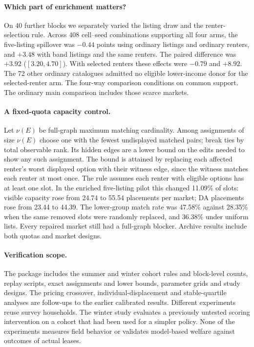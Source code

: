 \paragraph{Which part of enrichment matters?}
On 40 further blocks we separately varied the listing draw and the renter-selection rule. Across 408 cell--seed combinations supporting all four arms, the five-listing spillover was $-0.44$ points using ordinary listings and ordinary renters, and $+3.48$ with band listings and the same renters. The paired difference was $+3.92$ ($[3.20,4.70]$). With selected renters these effects were $-0.79$ and $+8.92$. The 72 other ordinary catalogues admitted no eligible lower-income donor for the selected-renter arm. The four-way comparison conditions on common support. The ordinary main comparison includes those scarce markets.

\paragraph{A fixed-quota capacity control.}
Let $\nu(E)$ be full-graph maximum matching cardinality. Among assignments of size $\nu(E)$ choose one with the fewest undisplayed matched pairs; break ties by total observable rank. Its hidden edges are a lower bound on the edits needed to show any such assignment. The bound is attained by replacing each affected renter's worst displayed option with their witness edge, since the witness matches each renter at most once. The rule assumes each renter with eligible options has at least one slot. In the enriched five-listing pilot this changed 11.09\% of slots: visible capacity rose from 24.74 to 55.54 placements per market; DA placements rose from 23.44 to 44.39. The lower-group match rate was 47.58\% against 28.35\% when the same removed slots were randomly replaced, and 36.38\% under uniform lists. Every repaired market still had a full-graph blocker. Archive results include both quotas and market designs.

\paragraph{Verification scope.}
The package includes the summer and winter cohort rules and block-level counts, replay scripts, exact assignments and lower bounds, parameter grids and study designs. The pricing crossover, individual-displacement and stable-quartile analyses are follow-ups to the earlier calibrated results. Different experiments reuse survey households. The winter study evaluates a previously untested scoring intervention on a cohort that had been used for a simpler policy. None of the experiments measures field behavior or validates model-based welfare against outcomes of actual leases.
